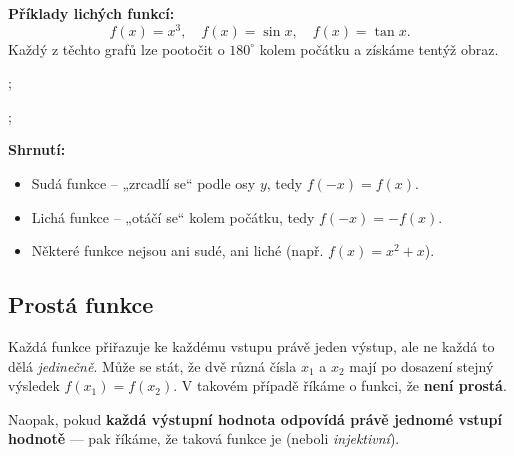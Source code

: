 \documentclass[12pt,a4paper]{article}
\begin{document}
\begin{examplebox}
\textbf{Příklady lichých funkcí:}
\[
f(x) = x^3, \quad f(x) = \sin x, \quad f(x) = \tan x.
\]
Každý z těchto grafů lze pootočit o \(180^\circ\) kolem počátku a získáme tentýž obraz.
\begin{minipage}{0.45\textwidth}
    \begin{center}
        \begin{axisgraph}[grid=none, xmin=-3, xmax=3, ymin=-3, ymax=3, title={Lichá funkce: \(f(x)=x^3\)}]
            ;
        \end{axisgraph}
    \end{center}
    \end{minipage}
    \hfill
    \begin{minipage}{0.45\textwidth}
    \begin{center}
        \begin{axisgraph}[grid=none, xmin=-3, xmax=3, ymin=-3, ymax=3, title={Lichá funkce: \(f(x)=sin(x)\)}]
            ;
        \end{axisgraph}
    \end{center}
    \end{minipage}
\end{examplebox}

\begin{notebox}
\textbf{Shrnutí:}
\begin{itemize}
  \item Sudá funkce – „zrcadlí se“ podle osy \(y\), tedy \(f(-x) = f(x)\).
  \item Lichá funkce – „otáčí se“ kolem počátku, tedy \(f(-x) = -f(x)\).
  \item Některé funkce nejsou ani sudé, ani liché (např. \(f(x) = x^2 + x\)).
\end{itemize}
\end{notebox}


\subsection*{Prostá funkce}

Každá funkce přiřazuje ke každému vstupu právě jeden výstup,  
ale ne každá to dělá \emph{jedinečně}.  
Může se stát, že dvě různá čísla \(x_1\) a \(x_2\) mají po dosazení stejný výsledek \(f(x_1) = f(x_2)\).  
V takovém případě říkáme o funkci, že \textbf{není prostá}.

Naopak, pokud \textbf{každá výstupní hodnota odpovídá právě jednomé vstupí hodnotě} —  
pak říkáme, že taková funkce je  (neboli \textit{injektivní}).  
\end{document}
